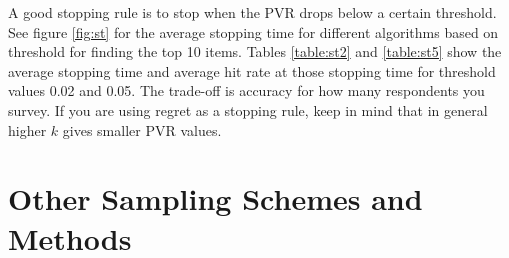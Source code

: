\documentclass[nonblindrev]{informs3}
\begin{document}
A good stopping rule is to stop when the PVR drops below a certain threshold. See figure \ref{fig:st} for the average stopping time for different algorithms based on threshold for finding the top 10 items. Tables \ref{table:st2} and \ref{table:st5} show the average stopping time and average hit rate at those stopping time for threshold values 0.02 and 0.05. The trade-off is accuracy for how many respondents you survey. If you are using regret as a stopping rule, keep in mind that in general higher $k$ gives smaller PVR values.\\ 
\section{Other Sampling Schemes and Methods}
\end{document}
